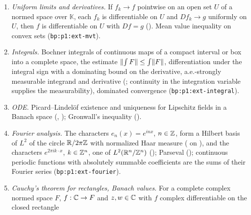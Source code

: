 {\begin{enumerate}[label=(W1-E\arabic*),ref=(W1-E\arabic*)]
  (); continuous linear maps commute with Bochner integrals
  () and the norm is attained by norm-one functionals
  (); holomorphic maps on open subsets of $\C$ are
  analytic (); a locally uniform limit of holomorphic maps on an open subset of
  $\C$ is holomorphic ().
\item\label{bpW:w1:ext-unifderiv} \emph{Uniform limits and derivatives.} If $f_k\to f$ pointwise on an open set $U$ of
  a normed space over $\mathbb K$, each $f_k$ is differentiable on $U$ and $Df_k\to g$ uniformly on $U$, then $f$ is
  differentiable on $U$ with $Df=g$ (). Mean value inequality on convex
  sets (\texttt{bp:p1:ext-mvt}).
\item\label{bpW:w1:ext-integral} \emph{Integrals.} Bochner integrals of continuous maps of a compact interval or box
  into a complete space, the estimate $\lVert \int F\rVert\le\int\lVert F\rVert$, differentiation under the integral sign with a
  dominating bound on the derivative, a.e.-strongly measurable integrand and derivative
  (; continuity in the integration variable supplies
  the measurability), dominated
  convergence (\texttt{bp:p1:ext-integral}).
\item\label{bpW:w1:ext-ode} \emph{ODE.} Picard--Lindel\"of existence and uniqueness for Lipschitz fields in a Banach
  space (, ); Gronwall's inequality
  ().
\item\label{bpW:w1:ext-fourier} \emph{Fourier analysis.} The characters $e_n(x)=e^{inx}$, $n\in\mathbb{Z}$, form a Hilbert
  basis of $L^2$ of the circle $\mathbb{R}/2\pi\mathbb{Z}$ with normalized Haar measure ( on
  ), and the characters $e^{2\pi ik\cdot x}$, $k\in\mathbb{Z}^n$, one of $L^2(\mathbb{R}^n/\mathbb{Z}^n)$
  (); Parseval (); continuous periodic functions
  with absolutely summable coefficients are the sums of their Fourier series (\texttt{bp:p1:ext-fourier}).
\item\label{bpW:w1:ext-rect} \emph{Cauchy's theorem for rectangles, Banach values.} For a complete complex normed
  space $F$, $f:\mathbb{C}\to F$ and $z,w\in\mathbb{C}$ with $f$ complex differentiable on the closed rectangle

\end{enumerate}}
